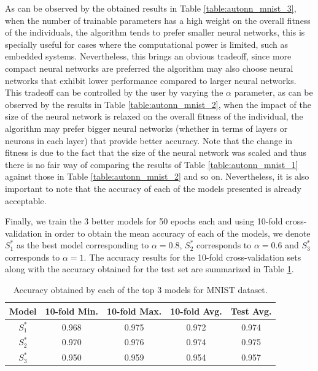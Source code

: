 \documentclass[journal]{IEEEtran}
\begin{document}
As can be observed by the obtained results in Table \ref{table:autonn_mnist_3}, when the number of trainable parameters has a high weight on the overall fitness of the individuals, the algorithm tends to prefer smaller neural networks, this is specially useful for cases where the computational power is limited, such as embedded systems. Nevertheless, this brings an obvious tradeoff, since more compact neural networks are preferred the algorithm may also choose neural networks that exhibit lower performance compared to larger neural networks. This tradeoff can be controlled by the user by varying the $\alpha$ parameter, as can be observed by the results in Table \ref{table:autonn_mnist_2}, when the impact of the size of the neural network is relaxed on the overall fitness of the individual, the algorithm may prefer bigger neural networks (whether in terms of layers or neurons in each layer) that provide better accuracy. Note that the change in fitness is due to the fact that the size of the neural network was scaled and thus there is no fair way of comparing the results of Table \ref{table:autonn_mnist_1} against those in Table \ref{table:autonn_mnist_2} and so on. Nevertheless, it is also important to note that the accuracy of each of the models presented is already acceptable.

Finally, we train the 3 better models for 50 epochs each and using 10-fold cross-validation in order to obtain the mean accuracy of each of the models, we denote $ S^*_1$ as the best model corresponding to $\alpha = 0.8$, $S^*_2$ corresponds to $\alpha = 0.6$ and $S^*_3$ corresponds to $\alpha = 1$. The accuracy results for the 10-fold cross-validation sets along with the accuracy obtained for the test set are summarized in Table \ref{table:avg_accuracies_mnist}.

\begin{table}[!htb]
\begin{center}
\begin{tabular}{| c | c | c | c | c |}
\hline
Model & 10-fold Min. & 10-fold Max. & 10-fold Avg. & Test Avg. \\
\hline
$S^*_1$ & 0.968 & 0.975 & 0.972 & 0.974\\
$S^*_2$ & 0.970 & 0.976 & 0.974 & 0.975\\
$S^*_3$ & 0.950 & 0.959 & 0.954 & 0.957\\
\hline
\end{tabular}
\end{center}
\caption{Accuracy obtained by each of the top 3 models for MNIST dataset.}
\label{table:avg_accuracies_mnist}
\end{table}
\end{document}
